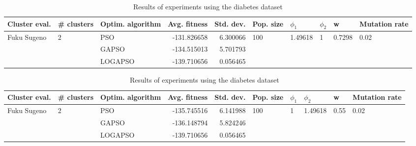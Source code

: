 \documentclass{article}
\begin{document}
\begin{table}
\centering
\caption{Results of experiments using the diabetes dataset}
\begin{tabular}{lllrrlllll}
\toprule
               Cluster eval. &        \# clusters & Optim. algorithm &  Avg. fitness &  Std. dev. &            Pop. size &               $\phi_{1}$ &         $\phi_{2}$ &                       w &         Mutation rate \\
\midrule
\multirow{3}{*}{Fuku Sugeno} & \multirow{3}{*}{2} &              PSO &   -131.826658 &   6.300066 & \multirow{3}{*}{100} & \multirow{3}{*}{1.49618} & \multirow{3}{*}{1} & \multirow{3}{*}{0.7298} & \multirow{3}{*}{0.02} \\
                             &                    &            GAPSO &   -134.515013 &   5.701793 &                      &                          &                    &                         &                       \\
                             &                    &          LOGAPSO &   -139.710656 &   0.056465 &                      &                          &                    &                         &                       \\
\bottomrule
\end{tabular}
\end{table}
\begin{table}
\centering
\caption{Results of experiments using the diabetes dataset}
\begin{tabular}{lllrrlllll}
\toprule
               Cluster eval. &        \# clusters & Optim. algorithm &  Avg. fitness &  Std. dev. &            Pop. size &         $\phi_{1}$ &               $\phi_{2}$ &                     w &         Mutation rate \\
\midrule
\multirow{3}{*}{Fuku Sugeno} & \multirow{3}{*}{2} &              PSO &   -135.745516 &   6.141988 & \multirow{3}{*}{100} & \multirow{3}{*}{1} & \multirow{3}{*}{1.49618} & \multirow{3}{*}{0.55} & \multirow{3}{*}{0.02} \\
                             &                    &            GAPSO &   -136.148794 &   5.824246 &                      &                    &                          &                       &                       \\
                             &                    &          LOGAPSO &   -139.710656 &   0.056465 &                      &                    &                          &                       &                       \\
\bottomrule
\end{tabular}
\end{table}
\end{document}
